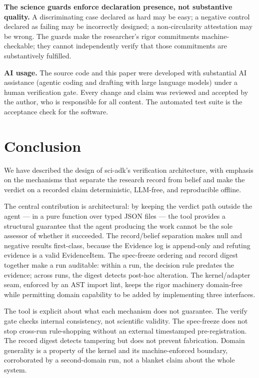 \documentclass[11pt]{article}
\begin{document}
\textbf{The science guards enforce declaration presence, not substantive quality.} A discriminating case declared as hard may be easy; a negative control declared as failing may be incorrectly designed; a non-circularity attestation may be wrong. The guards make the researcher's rigor commitments machine-checkable; they cannot independently verify that those commitments are substantively fulfilled.

\textbf{AI usage.} The source code and this paper were developed with substantial AI assistance (agentic coding and drafting with large language models) under a human verification gate. Every change and claim was reviewed and accepted by the author, who is responsible for all content. The automated test suite is the acceptance check for the software.

\section{Conclusion}

We have described the design of sci-adk's verification architecture, with emphasis on the mechanisms that separate the research record from belief and make the verdict on a recorded claim deterministic, LLM-free, and reproducible offline.

The central contribution is architectural: by keeping the verdict path outside the agent --- in a pure function over typed JSON files --- the tool provides a structural guarantee that the agent producing the work cannot be the sole assessor of whether it succeeded. The record/belief separation makes null and negative results first-class, because the Evidence log is append-only and refuting evidence is a valid EvidenceItem. The spec-freeze ordering and record digest together make a run auditable: within a run, the decision rule predates the evidence; across runs, the digest detects post-hoc alteration. The kernel/adapter seam, enforced by an AST import lint, keeps the rigor machinery domain-free while permitting domain capability to be added by implementing three interfaces.

The tool is explicit about what each mechanism does not guarantee. The verify gate checks internal consistency, not scientific validity. The spec-freeze does not stop cross-run rule-shopping without an external timestamped pre-registration. The record digest detects tampering but does not prevent fabrication. Domain generality is a property of the kernel and its machine-enforced boundary, corroborated by a second-domain run, not a blanket claim about the whole system.
\end{document}

